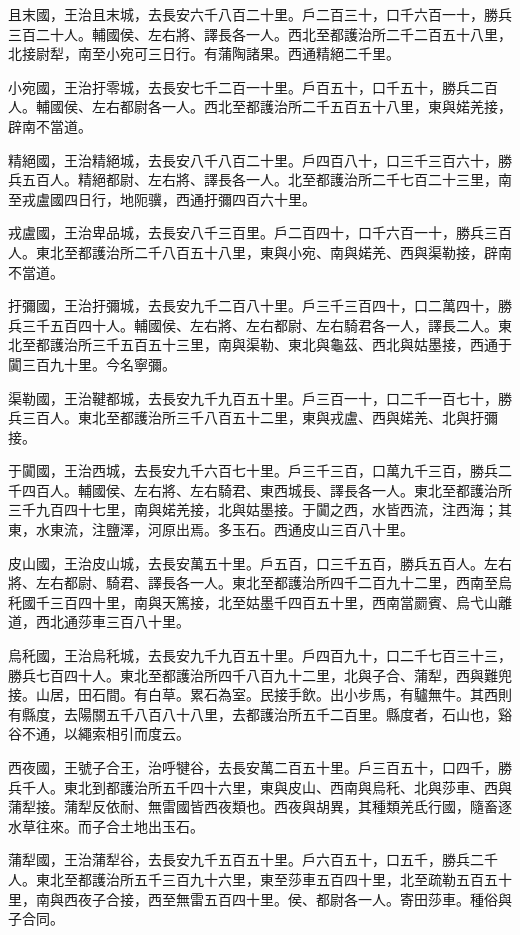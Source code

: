 \begin{pinyinscope}
且末國，王治且末城，去長安六千八百二十里。戶二百三十，口千六百一十，勝兵三百二十人。輔國侯、左右將、譯長各一人。西北至都護治所二千二百五十八里，北接尉犁，南至小宛可三日行。有蒲陶諸果。西通精絕二千里。

小宛國，王治扜零城，去長安七千二百一十里。戶百五十，口千五十，勝兵二百人。輔國侯、左右都尉各一人。西北至都護治所二千五百五十八里，東與婼羌接，辟南不當道。

精絕國，王治精絕城，去長安八千八百二十里。戶四百八十，口三千三百六十，勝兵五百人。精絕都尉、左右將、譯長各一人。北至都護治所二千七百二十三里，南至戎盧國四日行，地阨骥，西通扜彌四百六十里。

戎盧國，王治卑品城，去長安八千三百里。戶二百四十，口千六百一十，勝兵三百人。東北至都護治所二千八百五十八里，東與小宛、南與婼羌、西與渠勒接，辟南不當道。

扜彌國，王治扜彌城，去長安九千二百八十里。戶三千三百四十，口二萬四十，勝兵三千五百四十人。輔國侯、左右將、左右都尉、左右騎君各一人，譯長二人。東北至都護治所三千五百五十三里，南與渠勒、東北與龜茲、西北與姑墨接，西通于闐三百九十里。今名寧彌。

渠勒國，王治鞬都城，去長安九千九百五十里。戶三百一十，口二千一百七十，勝兵三百人。東北至都護治所三千八百五十二里，東與戎盧、西與婼羌、北與扜彌接。

于闐國，王治西城，去長安九千六百七十里。戶三千三百，口萬九千三百，勝兵二千四百人。輔國侯、左右將、左右騎君、東西城長、譯長各一人。東北至都護治所三千九百四十七里，南與婼羌接，北與姑墨接。于闐之西，水皆西流，注西海；其東，水東流，注鹽澤，河原出焉。多玉石。西通皮山三百八十里。

皮山國，王治皮山城，去長安萬五十里。戶五百，口三千五百，勝兵五百人。左右將、左右都尉、騎君、譯長各一人。東北至都護治所四千二百九十二里，西南至烏秅國千三百四十里，南與天篤接，北至姑墨千四百五十里，西南當罽賓、烏弋山離道，西北通莎車三百八十里。

烏秅國，王治烏秅城，去長安九千九百五十里。戶四百九十，口二千七百三十三，勝兵七百四十人。東北至都護治所四千八百九十二里，北與子合、蒲犁，西與難兜接。山居，田石間。有白草。累石為室。民接手飲。出小步馬，有驢無牛。其西則有縣度，去陽關五千八百八十八里，去都護治所五千二百里。縣度者，石山也，谿谷不通，以繩索相引而度云。

西夜國，王號子合王，治呼犍谷，去長安萬二百五十里。戶三百五十，口四千，勝兵千人。東北到都護治所五千四十六里，東與皮山、西南與烏秅、北與莎車、西與蒲犁接。蒲犁反依耐、無雷國皆西夜類也。西夜與胡異，其種類羌氐行國，隨畜逐水草往來。而子合土地出玉石。

蒲犁國，王治蒲犁谷，去長安九千五百五十里。戶六百五十，口五千，勝兵二千人。東北至都護治所五千三百九十六里，東至莎車五百四十里，北至疏勒五百五十里，南與西夜子合接，西至無雷五百四十里。侯、都尉各一人。寄田莎車。種俗與子合同。


\end{pinyinscope}
